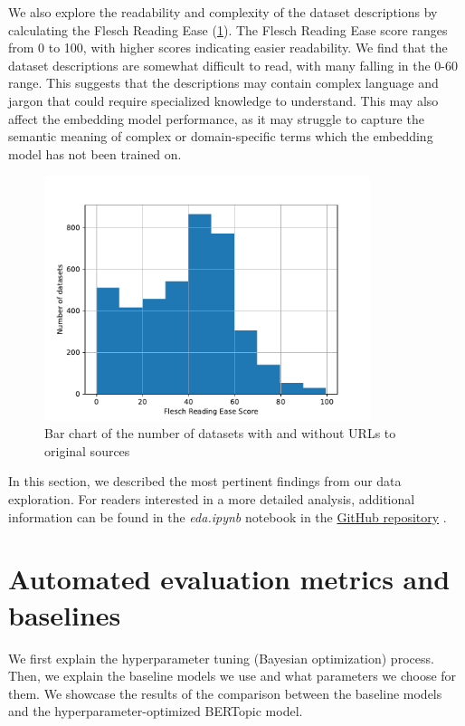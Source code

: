 We also explore the readability and complexity of the dataset descriptions by calculating the Flesch Reading Ease \cite{flesch_new_1948} (\cref{fig:flesch_reading_ease}). The Flesch Reading Ease score ranges from 0 to 100, with higher scores indicating easier readability. We find that the dataset descriptions are somewhat difficult to read, with many falling in the 0-60 range. This suggests that the descriptions may contain complex language and jargon that could require specialized knowledge to understand. This may also affect the embedding model performance, as it may struggle to capture the semantic meaning of complex or domain-specific terms which the embedding model has not been trained on.

\begin{figure}[h]
    \centering
    \includegraphics[width=0.85\textwidth]{figures/flesch_reading_ease.pdf}
    \caption{Bar chart of the number of datasets with and without URLs to original sources}
    \label{fig:flesch_reading_ease}
\end{figure}

In this section, we described the most pertinent findings from our data exploration. For readers interested in a more detailed analysis, additional information can be found in the \textit{eda.ipynb} notebook in the \href{https://github.com/ivangermanov/openml-tags}{GitHub repository} \cite{germanov_topic_modeling_of_2024}.

\section{Automated evaluation metrics and baselines}
We first explain the hyperparameter tuning (Bayesian optimization) process. Then, we explain the baseline models we use and what parameters we choose for them. We showcase the results of the comparison between the baseline models and the hyperparameter-optimized BERTopic model.

